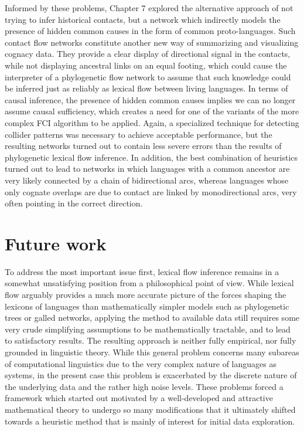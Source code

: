 Informed by these problems, Chapter 7 explored the alternative approach of not trying to infer historical contacts, but a network which indirectly models the presence of hidden common causes in the form of common proto-languages. Such contact flow networks constitute another new way of summarizing and visualizing cognacy data. They provide a clear display of directional signal in the contacts, while not displaying ancestral links on an equal footing, which could cause the interpreter of a phylogenetic flow network to assume that such knowledge could be inferred just as reliably as lexical flow between living languages. In terms of causal inference, the presence of hidden common causes implies we can no longer assume causal sufficiency, which creates a need for one of the variants of the more complex FCI algorithm to be applied. Again, a specialized technique for detecting collider patterns was necessary to achieve acceptable performance, but the resulting networks turned out to contain less severe errors than the 
results of phylogenetic lexical flow inference. In addition, the best combination of heuristics turned out to lead to networks in which languages with a common ancestor are very likely connected by a chain of bidirectional arcs, whereas languages whose only cognate overlaps are due to contact are linked by monodirectional arcs, very often pointing in the correct direction. 

\section{Future work}
To address the most important issue first, lexical flow inference remains in a somewhat unsatisfying position from a philosophical point of view. While lexical flow arguably provides a much more accurate picture of the forces shaping the lexicons of languages than mathematically simpler models such as phylogenetic trees or galled networks, applying the method to available data still requires some very crude simplifying assumptions to be mathematically tractable, and to lead to satisfactory results. The resulting approach is neither fully empirical, nor fully grounded in linguistic theory. While this general problem concerns many subareas of computational linguistics due to the very complex nature of languages as systems, in the present case this problem is exacerbated by the discrete nature of the underlying data and the rather high noise levels. These problems forced a framework which started out motivated by a well-developed and attractive mathematical theory to undergo so many modifications that it ultimately 
shifted towards a heuristic method that is mainly of interest for initial data exploration.

